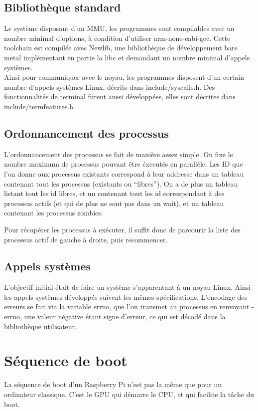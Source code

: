 \documentclass[a4paper]{article}
\begin{document}
\subsection{Bibliothèque standard}
Le système disposant d'un MMU, les programmes sont compilables avec un nombre
minimal d'options, à condition d'utiliser arm-none-eabi-gcc. Cette toolchain
est compilée avec Newlib, une bibliothèque de développement bare metal
implémentant en partie la libc et demandant un nombre minimal d'appels systèmes. \\
Ainsi pour communiquer avec le noyau, les programmes disposent d'un certain
nombre d'appels systèmes Linux, décrits dans include/syscalls.h.
Des fonctionnalités de terminal furent aussi développées, elles sont décrites
dans include/termfeatures.h.

\subsection{Ordonnancement des processus}

L'ordonnancement des processus se fait de manière assez simple. On fixe le
nombre maximum de processus pouvant être éxecutés en parallèle. Les ID que l'on
donne aux processus existants correspond à leur addresse dans un tableau
contenant tout les processus (existants ou ``libres''). On a de plus un tableau
listant tout les id libres, et un contenant tout les id correspondant à des
processus actifs (et qui de plus ne sont pas dans un wait), et un tableau
contenant les processus zombies.

Pour récupérer les processus à exécuter, il suffit donc de parcourir la liste
des processus actif de gauche à droite, puis recommencer.

\subsection{Appels systèmes}
L'objectif initial était de faire un système s'apparentant à un noyau Linux.
Ainsi les appels systèmes développés suivent les mêmes spécifications.
L'encodage des erreurs se fait via la variable errno, que l'on transmet au
processus en renvoyant -errno, une valeur négative étant signe d'erreur, ce qui
est décodé dans la bibliothèque utilisateur.

\section{Séquence de boot}

La séquence de boot d'un Raspberry Pi n'est pas la même que pour un ordinateur
classique. C'est le GPU qui démarre le CPU, et qui facilite la tâche du boot.
\end{document}
